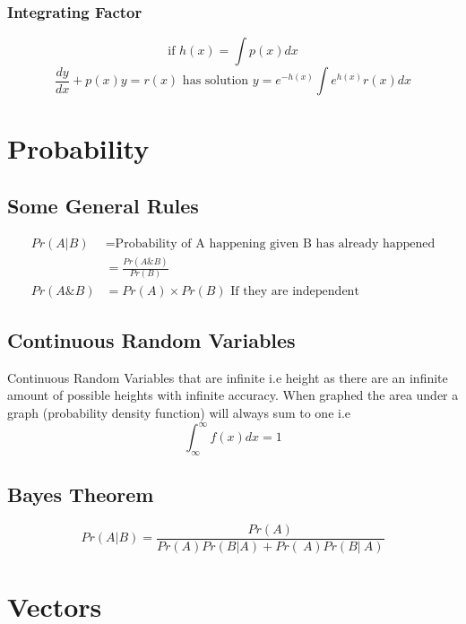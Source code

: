 \documentclass[12pt] {article}
\begin{document}
\subsubsection*{Integrating Factor}
\begin{equation*}
\text{if } h(x)=\int p(x)dx
\end{equation*}
\begin{equation*}
  \frac{dy}{dx} + p(x)y = r(x) \text{ has solution } y = e^{-h(x)} \int e^{h(x)}r(x)dx
\end{equation*}

\section{Probability}
\subsection*{Some General Rules}
\begin{align*}
  Pr(A \vert B) &= \text{Probability of A happening given B has already happened} \\
                &= \frac{Pr(A\&B)}{Pr(B)} \\
  Pr(A \& B) &= Pr(A) \times Pr(B) \text{ If they are independent}
\end{align*}
\subsection*{Continuous Random Variables}
Continuous Random Variables that are infinite i.e height as there are an infinite amount 
of possible heights with infinite accuracy. When graphed the area under a graph (probability density function)
will always sum to one i.e
\begin{equation*}
  \int_\infty^\infty f(x)dx = 1 
\end{equation*}
\subsection*{Bayes Theorem}
\begin{equation*}
  Pr(A \vert B) = \frac{Pr(A)}{Pr(A)Pr(B \vert A) + Pr(~A)Pr(B \vert ~A)}
\end{equation*}

\section{Vectors}
\newpage
\end{document}
